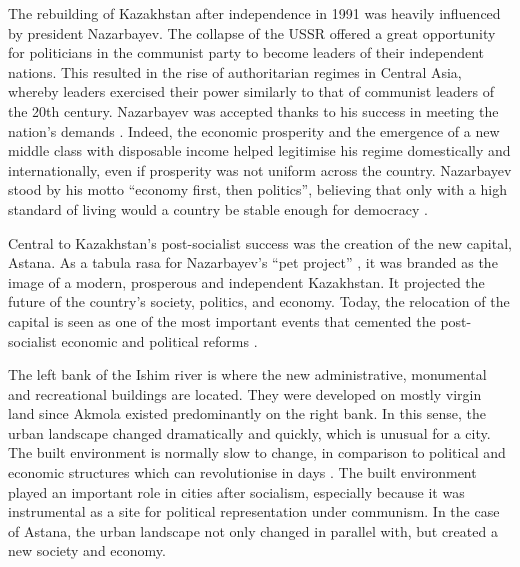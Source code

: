 \documentclass{article}
\begin{document}
The rebuilding of Kazakhstan after independence in 1991 was heavily influenced by president Nazarbayev. The collapse of the USSR offered a great opportunity for politicians in the communist party to become leaders of their independent nations. This resulted in the rise of authoritarian regimes in Central Asia, whereby leaders exercised their power similarly to that of communist leaders of the 20th century. Nazarbayev was accepted thanks to his success in meeting the nation's demands \parencite{isaacs2010papa}. Indeed, the economic prosperity and the emergence of a new middle class with disposable income helped legitimise his regime  domestically and internationally, even if prosperity was not uniform across the country. Nazarbayev stood by his motto ``economy first, then politics'', believing that only with a high standard of living would a country be stable enough for democracy \parencite{kassymbekov_2020}.

Central to Kazakhstan's post-socialist success was the creation of the new capital, Astana. As a tabula rasa for Nazarbayev's ``pet project'' \parencite{koch2010monumental}, it was branded as the image of a modern, prosperous and independent Kazakhstan. It projected the future of the country's society, politics, and economy. Today, the relocation of the capital is seen as one of the most important events that cemented the post-socialist economic and political reforms \parencite{kassymbekov_2020}.

The left bank of the Ishim river is where the new administrative, monumental and recreational buildings are located. 
They were developed on mostly virgin land since Akmola existed predominantly on the right bank. 
In this sense, the urban landscape changed dramatically and quickly, which is unusual for a city. The built environment is normally slow to change, in comparison to political and economic structures which can revolutionise in days \parencite{stanilov2007post}. The built environment played an important role in cities after socialism, especially because it was instrumental as a site for political representation under communism. In the case of Astana, the urban landscape not only changed in parallel with, but created a new society and economy. 
\end{document}
